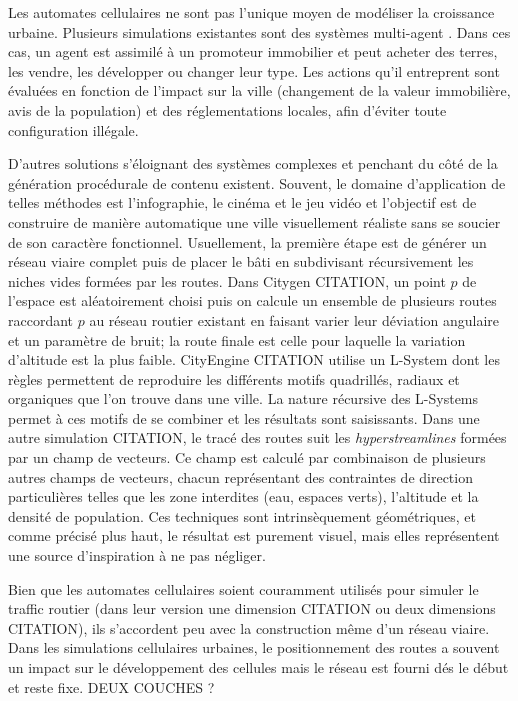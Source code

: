 \documentclass[10pt]{article}
\begin{document}
\begin{multicols}{2}
Les automates cellulaires ne sont pas l'unique moyen de modéliser la
croissance urbaine. Plusieurs simulations existantes sont des systèmes
multi-agent \cite{Lechnera,Lechner2004}. Dans ces cas, un agent est
assimilé à un promoteur immobilier et peut acheter des terres, les
vendre, les développer ou changer leur type. Les actions qu'il
entreprent sont évaluées en fonction de l'impact sur la ville
(changement de la valeur immobilière, avis de la population) et des
réglementations locales, afin d'éviter toute configuration
illégale.

D'autres solutions s'éloignant des systèmes complexes et penchant du
côté de la génération procédurale de contenu existent. Souvent, le
domaine d'application de telles méthodes est l'infographie, le cinéma
et le jeu vidéo et l'objectif est de construire de manière automatique
une ville visuellement réaliste sans se soucier de son caractère
fonctionnel. Usuellement, la première étape est de générer un réseau
viaire complet puis de placer le bâti en subdivisant récursivement les
niches vides formées par les routes. Dans Citygen CITATION, un point
$p$ de l'espace est aléatoirement choisi puis on calcule un ensemble
de plusieurs routes raccordant $p$ au réseau routier existant en
faisant varier leur déviation angulaire et un paramètre de bruit; la
route finale est celle pour laquelle la variation d'altitude est la
plus faible. CityEngine CITATION utilise un L-System dont les règles
permettent de reproduire les différents motifs quadrillés, radiaux et
organiques que l'on trouve dans une ville. La nature récursive des
L-Systems permet à ces motifs de se combiner et les résultats sont
saisissants. Dans une autre simulation CITATION, le tracé des routes
suit les \textit{hyperstreamlines} formées par un champ de
vecteurs. Ce champ est calculé par combinaison de plusieurs autres
champs de vecteurs, chacun représentant des contraintes de direction
particulières telles que les zone interdites (eau, espaces verts),
l'altitude et la densité de population. Ces techniques sont
intrinsèquement géométriques, et comme précisé plus haut, le résultat
est purement visuel, mais elles représentent une source d'inspiration
à ne pas négliger.

Bien que les automates cellulaires soient couramment utilisés pour
simuler le traffic routier (dans leur version une dimension CITATION
ou deux dimensions CITATION), ils s'accordent peu avec la construction
même d'un réseau viaire. Dans les simulations cellulaires urbaines, le
positionnement des routes a souvent un impact sur le développement des
cellules mais le réseau est fourni dés le début et reste
fixe. DEUX COUCHES ?


\end{multicols}
\end{document}
